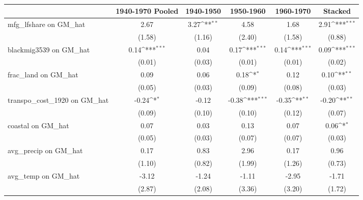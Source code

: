 \begin{table}[htbp]\centering
\def\sym#1{\ifmmode^{#1}\else\(^{#1}\)\fi}
\caption{}
\begin{tabular}{l*{5}{c}}
\toprule
                &\multicolumn{1}{c}{1940-1970 Pooled}&\multicolumn{1}{c}{1940-1950}&\multicolumn{1}{c}{1950-1960}&\multicolumn{1}{c}{1960-1970}&\multicolumn{1}{c}{Stacked}\\
\midrule
mfg\_lfshare on GM\_hat&     2.67         &     3.27\sym{**} &     4.58         &     1.68         &     2.91\sym{***}\\
                &   (1.58)         &   (1.16)         &   (2.40)         &   (1.58)         &   (0.88)         \\
\addlinespace
blackmig3539 on GM\_hat&     0.14\sym{***}&     0.04         &     0.17\sym{***}&     0.14\sym{***}&     0.09\sym{***}\\
                &   (0.01)         &   (0.03)         &   (0.01)         &   (0.01)         &   (0.02)         \\
\addlinespace
frac\_land on GM\_hat&     0.09         &     0.06         &     0.18\sym{*}  &     0.12         &     0.10\sym{**} \\
                &   (0.05)         &   (0.03)         &   (0.09)         &   (0.08)         &   (0.03)         \\
\addlinespace
transpo\_cost\_1920 on GM\_hat&    -0.24\sym{*}  &    -0.12         &    -0.38\sym{***}&    -0.35\sym{**} &    -0.20\sym{**} \\
                &   (0.09)         &   (0.10)         &   (0.10)         &   (0.12)         &   (0.07)         \\
\addlinespace
coastal on GM\_hat&     0.07         &     0.03         &     0.13         &     0.07         &     0.06\sym{*}  \\
                &   (0.05)         &   (0.03)         &   (0.07)         &   (0.07)         &   (0.03)         \\
\addlinespace
avg\_precip on GM\_hat&     0.17         &     0.83         &     2.96         &     0.17         &     0.96         \\
                &   (1.10)         &   (0.82)         &   (1.99)         &   (1.26)         &   (0.73)         \\
\addlinespace
avg\_temp on GM\_hat&    -3.12         &    -1.24         &    -1.11         &    -2.95         &    -1.71         \\
                &   (2.87)         &   (2.08)         &   (3.36)         &   (3.20)         &   (1.72)         \\

\end{tabular}
\end{table}
